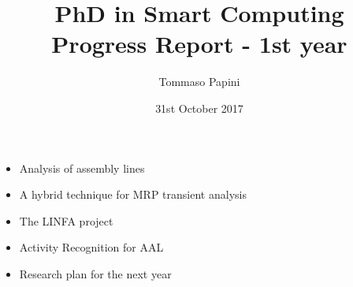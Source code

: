 
\title[PhD in Smart Computing - Progress Report - 1st year]{
  PhD in Smart Computing\\
  Progress Report - 1st year
}
\author{
  Tommaso Papini
}
\date{
  31st October 2017
}
  
\begin{frame}
  \titlepage
  
  \begin{itemize}
    \item Analysis of assembly lines
    \item A hybrid technique for MRP transient analysis
    \item The LINFA project
    \item Activity Recognition for AAL
    \item Research plan for the next year
  \end{itemize}
\end{frame}